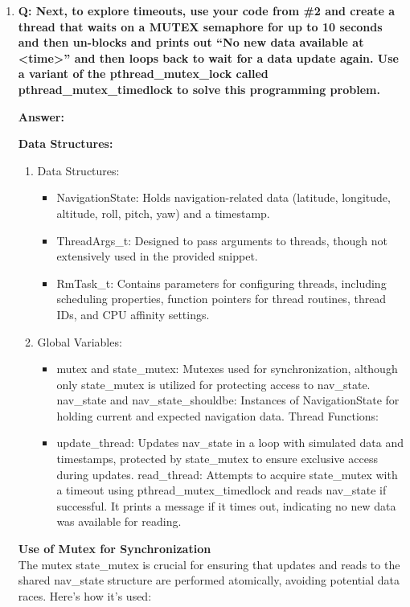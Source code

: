 \documentclass[a4paper,11pt]{article}%
\newenvironment{qanda}{\setlength{\parindent}{0pt}}{\bigskip}
\newcommand{\Q}{\bigskip\bfseries Q: }
\newcommand{\A}{\par\textbf{Answer: } \normalfont}
\begin{document}
\begin{qanda}
\begin{enumerate}
\begin{enumerate}
					

				\item \Q Next, to explore timeouts, use your code from \#2 and create a thread that waits on a
				      MUTEX semaphore for up to 10 seconds and then un-blocks and prints out “No new data
				      available at <time>” and then loops back to wait for a data update again. Use a variant of
				      the pthread\_mutex\_lock called pthread\_mutex\_timedlock to solve this programming
				      problem.
				      \A 

					  \textbf{Data Structures:}
					  \begin{enumerate}
						\item Data Structures:
						\begin{itemize}
							\item NavigationState: Holds navigation-related data (latitude, longitude, altitude, roll, pitch, yaw) and a timestamp.
							\item ThreadArgs\_t: Designed to pass arguments to threads, though not extensively used in the provided snippet.
							\item  RmTask\_t: Contains parameters for configuring threads, including scheduling properties, function pointers for thread routines, thread IDs, and CPU affinity settings.
						\end{itemize}
						\item Global Variables:
						\begin{itemize}
							\item mutex and state\_mutex: Mutexes used for synchronization, although only state\_mutex is utilized for protecting access to nav\_state.
							nav\_state and nav\_state\_shouldbe: Instances of NavigationState for holding current and expected navigation data.
							Thread Functions:
							
							\item update\_thread: Updates nav\_state in a loop with simulated data and timestamps, protected by state\_mutex to ensure exclusive access during updates.
							read\_thread: Attempts to acquire state\_mutex with a timeout using pthread\_mutex\_timedlock and reads nav\_state if successful. It prints a message if it times out, indicating no new data was available for reading.
						\end{itemize}
						

					  \end{enumerate}

					  \textbf{Use of Mutex for Synchronization}\\
The mutex state\_mutex is crucial for ensuring that updates and reads to the shared nav\_state structure are performed atomically, avoiding potential data races. Here's how it's used:


\end{enumerate}
\end{enumerate}
\end{qanda}
\end{document}
